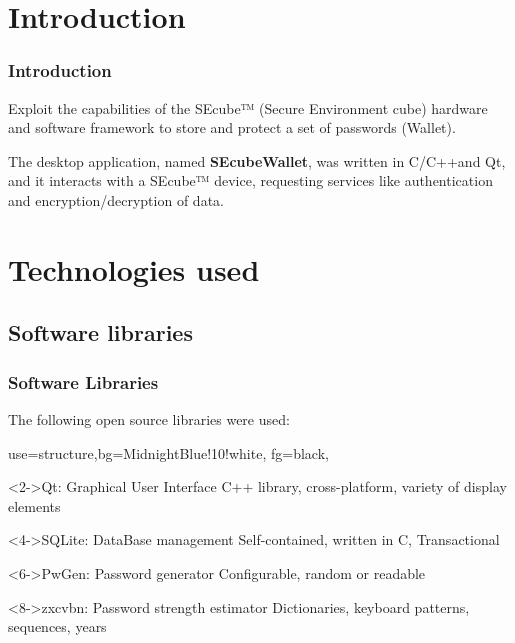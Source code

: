 \documentclass[14pt,usenames,dvipsnames]{beamer}
\begin{document}
\section{Introduction}



\begin{frame}
\frametitle{Introduction}
Exploit the capabilities of the SEcube™ (Secure Environment cube) hardware and software framework to store and protect a set of passwords (Wallet).

\vspace{10pt}
The desktop application, named \textbf{SEcubeWallet}, was written in C/C++and Qt, and it interacts with a SEcube™ device, requesting services like authentication and encryption/decryption of data.
\end{frame}



\section{Technologies used}

\subsection{Software libraries}
\begin{frame}
\frametitle{Software Libraries}

The following open source libraries were used:
{
 {use=structure,bg=MidnightBlue!10!white, fg=black,}

\begin{block}<2->{Qt: Graphical User Interface}
 {C++ library, cross-platform, variety of display elements}
\end{block}

\begin{block}<4->{SQLite: DataBase management}
 {Self-contained, written in C, Transactional}
\end{block}

\begin{block}<6->{PwGen: Password generator}
 {Configurable, random or readable}
\end{block}

\begin{block}<8->{zxcvbn: Password strength estimator}
 {Dictionaries, keyboard patterns, sequences, years}
\end{block}
}
\end{frame}
\end{document}
